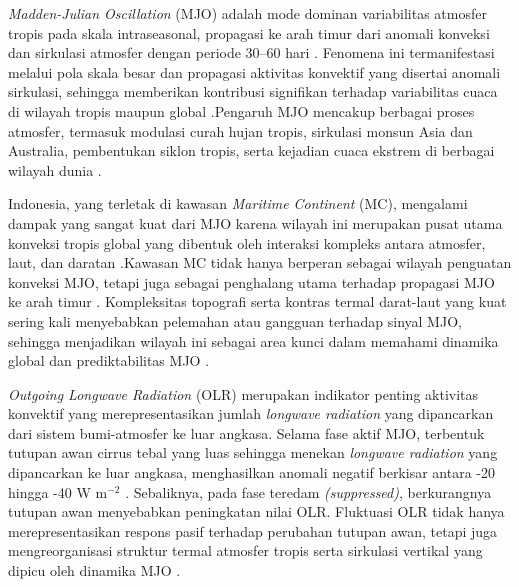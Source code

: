 \documentclass[12pt,a4paper]{report}
\begin{document}
\textit{Madden-Julian Oscillation} (MJO) adalah mode dominan variabilitas atmosfer tropis pada skala intraseasonal, propagasi ke arah timur dari anomali konveksi dan sirkulasi atmosfer dengan periode 30–60 hari \cite{Zhang2017,Jiang2020}. Fenomena ini termanifestasi melalui pola skala besar dan propagasi aktivitas konvektif yang disertai anomali sirkulasi, sehingga memberikan kontribusi signifikan terhadap variabilitas cuaca di wilayah tropis maupun global \cite{Skinner2018}.Pengaruh MJO mencakup berbagai proses atmosfer, termasuk modulasi curah hujan tropis, sirkulasi monsun Asia dan Australia, pembentukan siklon tropis, serta kejadian cuaca ekstrem di berbagai wilayah dunia \cite{Auniyar2011}. 

Indonesia, yang terletak di kawasan \textit{Maritime Continent} (MC), mengalami dampak yang sangat kuat dari MJO karena wilayah ini merupakan pusat utama konveksi tropis global yang dibentuk oleh interaksi kompleks antara atmosfer, laut, dan daratan \cite{Matthews2016}.Kawasan MC tidak hanya berperan sebagai wilayah penguatan konveksi MJO, tetapi juga sebagai penghalang utama terhadap propagasi MJO ke arah timur \cite{Ling2025ERL}. Kompleksitas topografi serta kontras termal darat-laut yang kuat sering kali menyebabkan pelemahan atau gangguan terhadap sinyal MJO, sehingga menjadikan wilayah ini sebagai area kunci dalam memahami dinamika global dan prediktabilitas MJO \cite{Lu2025}.


\textit{Outgoing Longwave Radiation} (OLR) merupakan indikator penting aktivitas konvektif yang merepresentasikan jumlah \textit{longwave radiation} yang dipancarkan dari sistem bumi-atmosfer ke luar angkasa. Selama fase aktif MJO, terbentuk tutupan awan cirrus tebal yang luas sehingga menekan \textit{longwave radiation} yang dipancarkan ke luar angkasa, menghasilkan anomali negatif berkisar antara -20 hingga -40 W m$^{-2}$ \cite{Wheeler2004}. Sebaliknya, pada fase teredam \textit{(suppressed)}, berkurangnya tutupan awan menyebabkan peningkatan nilai OLR. Fluktuasi OLR tidak hanya merepresentasikan respons pasif terhadap perubahan tutupan awan, tetapi juga mengreorganisasi struktur termal atmosfer tropis serta sirkulasi vertikal yang dipicu oleh dinamika MJO \cite{Sobel2013}.
\end{document}
